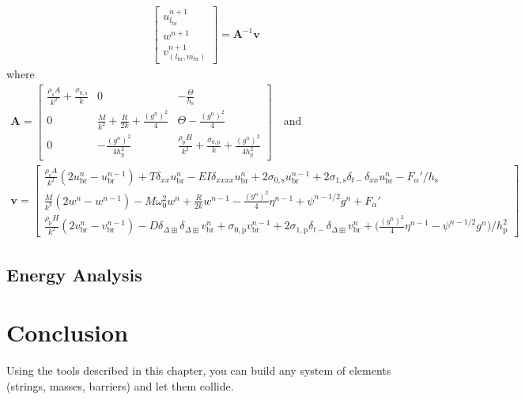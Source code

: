 \documentclass{article}
\begin{document}
\begin{align}
\begin{bmatrix}
        u^{n+1}_{l_\text{br}}\\
        w^{n+1}\\
        v^{n+1}_{(l_\text{br}, m_\text{br})}
    \end{bmatrix}
    = 
    \mathbf{A}^{-1}\mathbf{v}
\end{align}
where
\begin{equation}
\begin{gathered}
\mathbf{A} = 
    \begin{bmatrix}
        \frac{\rho_\text{s} A}{k^2} + \frac{\sigma_{0,\text{s}}}{k} & 0 & - \frac{\Theta}{h_\text{s}}\\
        0 & \frac{M}{k^2}+\frac{R}{2k}+\frac{(g^n)^2}{4} &\Theta-\frac{(g^n)^2}{4}\\
        0 & -\frac{(g^n)^2}{4h_\text{p}^2} & \frac{\rho_\text{p}H}{k^2} + \frac{\sigma_{0,\text{p}}}{k} + \frac{(g^n)^2}{4h_\text{p}^2}
    \end{bmatrix}
    \quad \text{and}\\
    \mathbf{v} = 
    \begin{bmatrix}
        \frac{\rho_\text{s} A}{k^2}(2u^n_\text{br}-u_\text{br}^{n-1})+T\delta_{xx}u_\text{br}^n-EI\delta_{xxxx}u_\text{br}^n + 2\sigma_{0,\text{s}}u_\text{br}^{n-1} + 2\sigma_{1,\text{s}}\delta_{t-}\delta_{xx}u_\text{br}^n - F_\alpha'/h_\text{s}\\
        \frac{M}{k^2}(2w^n-w^{n-1})-M\omega_0^2w^n + \frac{R}{2k}w^{n-1}-\frac{(g^n)^2}{4}\eta^{n-1}+\psi^{n-1/2}g^n + F_\alpha'\\
        \frac{\rho_\text{p}H}{k^2}(2v_\text{br}^n-v_\text{br}^{n-1})-D\delta_{\Delta\boxplus}\delta_{\Delta\boxplus}v_\text{br}^n+ \sigma_{0,\text{p}}v^{n-1}_\text{br} + 2\sigma_{1,\text{p}}\delta_{t-}\delta_{\Delta\boxplus}v^n_\text{br} + \Big(\frac{(g^n)^2}{4}\eta^{n-1}-\psi^{n-1/2}g^n\Big)/h_\text{p}^2
    \end{bmatrix}
    \nonumber
\end{gathered}
\end{equation}
\subsection{Energy Analysis}

\section{Conclusion}
Using the tools described in this chapter, you can build any system of elements (strings, masses, barriers) and let them collide.
\end{document}

